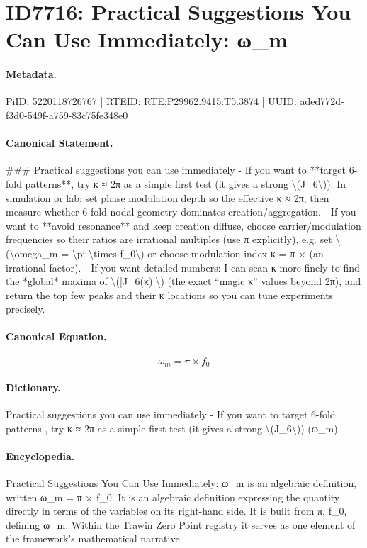 \section*{ID7716: Practical Suggestions You Can Use Immediately: ω\_m}
\paragraph{Metadata.}
PiID: 5220118726767 | RTEID: RTE:P29962.9415:T5.3874 | UUID: aded772d-f3d0-549f-a759-83c75fe348e0

\paragraph{Canonical Statement.}
\#\#\# Practical suggestions you can use immediately - If you want to **target 6-fold patterns**, try κ ≈ 2π as a simple first test (it gives a strong \textbackslash{}(J\_6\textbackslash{})). In simulation or lab: set phase modulation depth so the effective κ ≈ 2π, then measure whether 6-fold nodal geometry dominates creation/aggregation. - If you want to **avoid resonance** and keep creation diffuse, choose carrier/modulation frequencies so their ratios are irrational multiples (use π explicitly), e.g. set \textbackslash{}(\textbackslash{}omega\_m = \textbackslash{}pi \textbackslash{}times f\_0\textbackslash{}) or choose modulation index κ = π × (an irrational factor). - If you want detailed numbers: I can scan κ more finely to find the *global* maxima of \textbackslash{}(|J\_6(κ)|\textbackslash{}) (the exact “magic κ” values beyond 2π), and return the top few peaks and their κ locations so you can tune experiments precisely.

\paragraph{Canonical Equation.}
\[
\omega_m = \pi \times f_0
\]

\paragraph{Dictionary.}
Practical suggestions you can use immediately - If you want to target 6-fold patterns , try κ ≈ 2π as a simple first test (it gives a strong \textbackslash{}(J\_6\textbackslash{})) (ω\_m)

\paragraph{Encyclopedia.}
Practical Suggestions You Can Use Immediately: ω\_m is an algebraic definition, written ω\_m = π × f\_0. It is an algebraic definition expressing the quantity directly in terms of the variables on its right-hand side. It is built from π, f\_0, defining ω\_m. Within the Trawin Zero Point registry it serves as one element of the framework's mathematical narrative.
